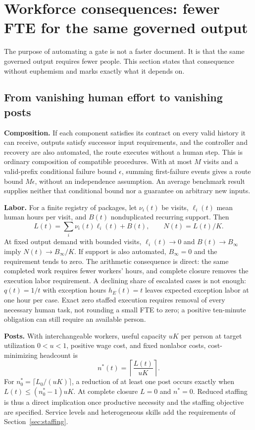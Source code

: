 \section{Workforce consequences: fewer FTE for the same governed output}
\label{sec:workforce}

The purpose of automating a gate is not a faster document. It is that the same governed output
requires fewer people. This section states that consequence without euphemism and marks exactly what
it depends on.

\subsection{From vanishing human effort to vanishing posts}

\textbf{Composition.} If each component satisfies its contract on every valid history it can receive,
outputs satisfy successor input requirements, and the controller and recovery are also automated, the
route executes without a human step. This is ordinary composition of compatible procedures. With at
most $M$ visits and a valid-prefix conditional failure bound $\epsilon$, summing first-failure events
gives a route bound $M\epsilon$, without an independence assumption. An average benchmark result
supplies neither that conditional bound nor a guarantee on arbitrary new inputs.

\textbf{Labor.} For a finite registry of packages, let $\nu_i(t)$ be visits, $\ell_i(t)$ mean human
hours per visit, and $B(t)$ nonduplicated recurring support. Then
\begin{equation}
L(t)=\sum_i \nu_i(t)\ell_i(t)+B(t),\qquad N(t)=L(t)/K. \label{eq:laborpath}
\end{equation}
At fixed output demand with bounded visits, $\ell_i(t)\to 0$ and $B(t)\to B_\infty$ imply
$N(t)\to B_\infty/K$. If support is also automated, $B_\infty=0$ and the requirement tends to zero. The
arithmetic consequence is direct: the same completed work requires fewer workers' hours, and complete
closure removes the execution labor requirement. A declining share of escalated cases is not enough:
$q(t)=1/t$ with exception hours $h_E(t)=t$ leaves expected exception labor at one hour per case. Exact
zero staffed execution requires removal of every necessary human task, not rounding a small FTE to
zero; a positive ten-minute obligation can still require an available person.

\textbf{Posts.} With interchangeable workers, useful capacity $uK$ per person at target utilization
$0<u<1$, positive wage cost, and fixed nonlabor costs, cost-minimizing headcount is
\begin{equation}
n^{*}(t)=\left\lceil \frac{L(t)}{uK} \right\rceil . \label{eq:headcount}
\end{equation}
For $n_0^{*}=\lceil L_0/(uK)\rceil$, a reduction of at least one post occurs exactly when
$L(t)\le (n_0^{*}-1)uK$. At complete closure $L=0$ and $n^{*}=0$. Reduced staffing is thus a direct
implication once productive necessity and the staffing objective are specified. Service levels and
heterogeneous skills add the requirements of Section~\ref{sec:staffing}.

